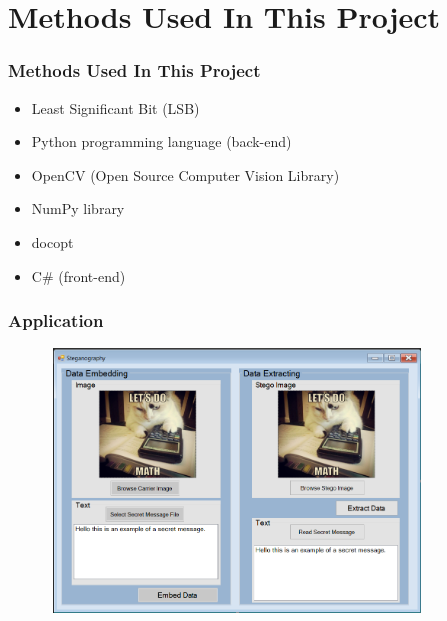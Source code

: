 \documentclass[12pt,hyperref={unicode}]{beamer}
\begin{document}
\section{Methods Used In This Project}
\begin{frame}
\frametitle{Methods Used In This Project}

\begin{itemize}
    \item Least Significant Bit (LSB)
    \item Python programming language (back-end)
    \item OpenCV (Open Source Computer Vision Library)
    \item NumPy library
    \item docopt
    \item C\# (front-end)
\end{itemize}
\end{frame}
\begin{frame}
\frametitle{Application}
\begin{figure}
    \centering
    \includegraphics[width=10cm, height=7cm]{stego.png}
    \label{fig:my_label}
\end{figure}
\end{frame}

\end{document}
